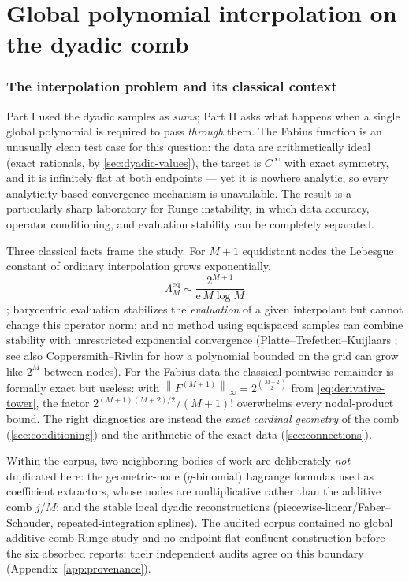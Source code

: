 \documentclass[11pt,oneside]{article}
\numberwithin{equation}{section}
\theoremstyle{definition}
\theoremstyle{remark}
\newcommand{\e}{\mathrm e}
\newcommand{\norm}[1]{\left\lVert #1\right\rVert}
\begin{document}
\part{Global polynomial interpolation on the dyadic comb}
\label{part:interp}

\section{The interpolation problem and its classical context}
\label{sec:interp-context}

Part I used the dyadic samples as \emph{sums}; Part II asks what
happens when a single global polynomial is required to pass
\emph{through} them.  The Fabius function is an unusually clean test
case for this question: the data are arithmetically ideal (exact
rationals, by \cref{sec:dyadic-values}), the target is $C^\infty$ with
exact symmetry, and it is infinitely flat at both endpoints --- yet it
is nowhere analytic, so every analyticity-based convergence mechanism
is unavailable.  The result is a particularly sharp laboratory for
Runge instability, in which data accuracy, operator conditioning, and
evaluation stability can be completely separated.

Three classical facts frame the study.  For $M+1$ equidistant nodes
the Lebesgue constant of ordinary interpolation grows exponentially,
\begin{equation}
 \Lambda^{\mathrm{eq}}_M
 \sim\frac{2^{M+1}}{\e\,M\log M}
 \label{eq:classical-lebesgue}
\end{equation}
\cite{Mills1992,Brutman1997,Smith2006}; barycentric evaluation
\cite{BerrutTrefethen2004,Higham2004} stabilizes the \emph{evaluation}
of a given interpolant but cannot change this operator norm; and no
method using equispaced samples can combine stability with
unrestricted exponential convergence (Platte--Trefethen--Kuijlaars
\cite{PlatteTrefethenKuijlaars2011}; see also Coppersmith--Rivlin
\cite{CoppersmithRivlin1992} for how a polynomial bounded on the grid
can grow like $2^{M}$ between nodes).  For the Fabius data the
classical pointwise remainder is formally exact but useless: with
$\norm{F^{(M+1)}}_\infty=2^{\binom{M+2}2}$ from
\eqref{eq:derivative-tower}, the factor
$2^{(M+1)(M+2)/2}/(M+1)!$ overwhelms every nodal-product bound.  The
right diagnostics are instead the \emph{exact cardinal geometry} of
the comb (\cref{sec:conditioning}) and the arithmetic of the exact
data (\cref{sec:connections}).

Within the corpus, two neighboring bodies of work are deliberately
\emph{not} duplicated here: the geometric-node ($q$-binomial) Lagrange
formulas used as coefficient extractors, whose nodes are
multiplicative rather than the additive comb $j/M$; and the stable
local dyadic reconstructions (piecewise-linear/Faber--Schauder,
repeated-integration splines).  The audited corpus contained no global
additive-comb Runge study and no endpoint-flat confluent construction
before the six absorbed reports; their independent audits agree on
this boundary (Appendix~\ref{app:provenance}).
\end{document}
